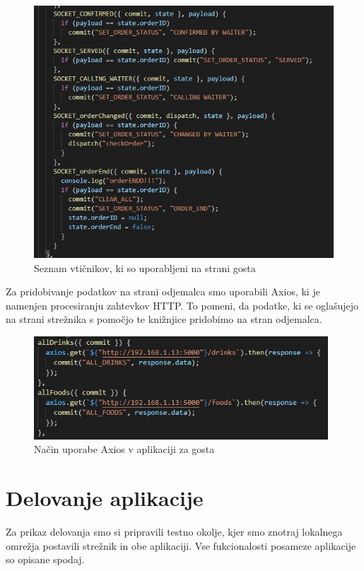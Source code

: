 \documentclass[a4paper, 12pt]{book}
\begin{document}
\begin{figure}[!htb]
\begin{center}
\includegraphics[width=12cm]{socketio_1.jpg}
\caption{Seznam vtičnikov, ki so uporabljeni na strani gosta}
\end{center}
\label{SocketIO_1}
\end{figure}


Za pridobivanje podatkov na strani odjemalca smo uporabili Axios, ki je namenjen procesiranju zahtevkov  HTTP. To pomeni, da podatke, ki se oglašujejo na strani strežnika s pomočjo te knižnjice pridobimo na stran odjemalca. 

\begin{figure}[!htb]
\begin{center}
\includegraphics[width=11cm]{axios_1.jpg}
\caption{Način uporabe Axios v aplikaciji za gosta}
\end{center}
\label{axios_1}
\end{figure}


\chapter {Delovanje aplikacije}
Za prikaz delovanja smo si pripravili testno okolje, kjer smo znotraj lokalnega omrežja postavili strežnik in obe aplikaciji. Vse fukcionalosti posameze aplikacije so opisane spodaj.
\end{document}
